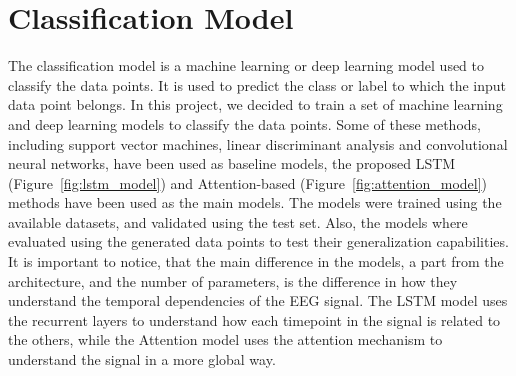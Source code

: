 \section{Classification Model}
The classification model is a machine learning or deep learning model used to classify the data points.
It is used to predict the class or label to which the input data point belongs.
In this project, we decided to train a set of machine learning and deep learning models to classify the data points.
Some of these methods, including support vector machines, linear discriminant analysis and convolutional neural networks, have been used as baseline models, the proposed LSTM (Figure~\ref{fig:lstm_model}) and Attention-based (Figure~\ref{fig:attention_model}) methods have been used as the main models.
The models were trained using the available datasets, and validated using the test set.
Also, the models where evaluated using the generated data points to test their generalization capabilities.
It is important to notice, that the main difference in the models, a part from the architecture, and the number of parameters, is the difference in how they understand the temporal dependencies of the EEG signal.
The LSTM model uses the recurrent layers to understand how each timepoint in the signal is related to the others, while the Attention model uses the attention mechanism to understand the signal in a more global way.

